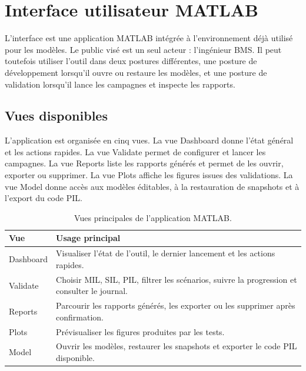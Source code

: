 \section{Interface utilisateur MATLAB}
\label{sec:ch5_ui}

L'interface est une application MATLAB intégrée à l'environnement déjà utilisé pour les modèles. Le public visé est un seul acteur : l'ingénieur BMS. Il peut toutefois utiliser l'outil dans deux postures différentes, une posture de développement lorsqu'il ouvre ou restaure les modèles, et une posture de validation lorsqu'il lance les campagnes et inspecte les rapports.

\subsection{Vues disponibles}
\label{subsec:ch5_vues}

L'application est organisée en cinq vues. La vue Dashboard donne l'état général et les actions rapides. La vue Validate permet de configurer et lancer les campagnes. La vue Reports liste les rapports générés et permet de les ouvrir, exporter ou supprimer. La vue Plots affiche les figures issues des validations. La vue Model donne accès aux modèles éditables, à la restauration de snapshots et à l'export du code PIL.

\begin{table}[H]
  \centering
  \small
  \begin{tabularx}{\textwidth}{|l|X|}
    \hline
    \textbf{Vue} & \textbf{Usage principal} \\
    \hline
    Dashboard & Visualiser l'état de l'outil, le dernier lancement et les actions rapides. \\
    \hline
    Validate & Choisir MIL, SIL, PIL, filtrer les scénarios, suivre la progression et consulter le journal. \\
    \hline
    Reports & Parcourir les rapports générés, les exporter ou les supprimer après confirmation. \\
    \hline
    Plots & Prévisualiser les figures produites par les tests. \\
    \hline
    Model & Ouvrir les modèles, restaurer les snapshots et exporter le code PIL disponible. \\
    \hline
  \end{tabularx}
  \captionsetup{width=0.86\textwidth, skip=15pt}
  \caption{Vues principales de l'application MATLAB.}
  \label{tab:ch5_vues_ui}
\end{table}

